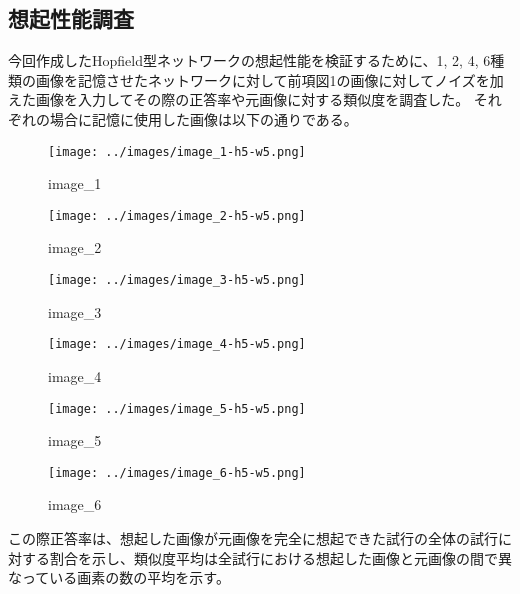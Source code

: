 \documentclass{ltjsarticle}
\begin{document}
\subsection{想起性能調査}
今回作成したHopfield型ネットワークの想起性能を検証するために、1, 2, 4, 6種類の画像を記憶させたネットワークに対して前項図1の画像に対してノイズを加えた画像を入力してその際の正答率や元画像に対する類似度を調査した。
それぞれの場合に記憶に使用した画像は以下の通りである。
\begin{figure}[h]
  \centering
  \begin{minipage}[b]{0.16\columnwidth}
      \centering
      \texttt{[image: ../images/image\_1-h5-w5.png]}
      \caption{image\_1}
  \end{minipage}
  \begin{minipage}[b]{0.16\columnwidth}
      \centering
      \texttt{[image: ../images/image\_2-h5-w5.png]}
      \caption{image\_2}
  \end{minipage}
  \begin{minipage}[b]{0.16\columnwidth}
      \centering
      \texttt{[image: ../images/image\_3-h5-w5.png]}
      \caption{image\_3}
  \end{minipage}
  \begin{minipage}[b]{0.16\columnwidth}
      \centering
      \texttt{[image: ../images/image\_4-h5-w5.png]}
      \caption{image\_4}
  \end{minipage}
  \begin{minipage}[b]{0.16\columnwidth}
      \centering
      \texttt{[image: ../images/image\_5-h5-w5.png]}
      \caption{image\_5}
  \end{minipage}
  \begin{minipage}[b]{0.16\columnwidth}
      \centering
      \texttt{[image: ../images/image\_6-h5-w5.png]}
      \caption{image\_6}
  \end{minipage}
\end{figure}
この際正答率は、想起した画像が元画像を完全に想起できた試行の全体の試行に対する割合を示し、類似度平均は全試行における想起した画像と元画像の間で異なっている画素の数の平均を示す。
\end{document}
